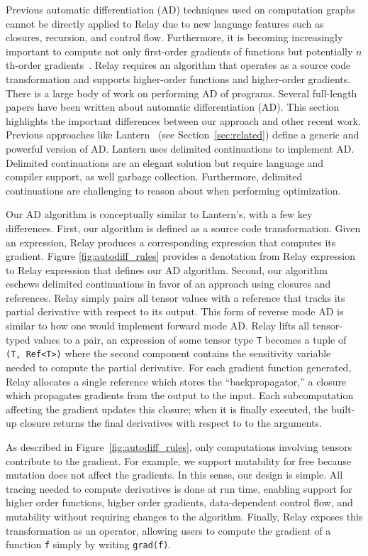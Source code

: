 Previous automatic differentiation (AD) techniques used on
  computation graphs cannot be directly applied to Relay due to new
  language features such as closures, recursion, and control flow.
Furthermore, it is becoming increasingly important to compute not
  only first-order gradients of functions
  but potentially $n$th-order gradients~\cite{neural_ode, darts}.
Relay requires an algorithm that operates as a source code transformation
  and supports higher-order functions and higher-order gradients.
There is a large body of work on performing AD
  of programs.
Several full-length papers have been written about automatic
  differentiation (AD).
This section highlights the important differences
  between our approach and other recent work.
Previous approaches like Lantern~\cite{lantern} (see Section~\ref{sec:related})
  define a generic and powerful version of AD.
Lantern uses delimited continuations to implement AD.
Delimited continuations are an elegant solution
  but require language and compiler support,
  as well garbage collection.
Furthermore, delimited continuations are challenging
  to reason about when performing optimization.

Our AD algorithm is conceptually similar to Lantern's,
  with a few key differences.
First, our algorithm is defined as a source code
  transformation.
Given an expression, Relay produces a corresponding
  expression that computes its gradient.
Figure \ref{fig:autodiff_rules} provides a denotation from
  Relay expression to Relay expression that defines our
  AD algorithm.
Second, our algorithm eschews delimited continuations in favor of
  an approach using closures and references.
Relay simply pairs all tensor values with a reference
  that tracks its partial derivative with respect to its
  output.
This form of reverse mode AD is similar to how one
  would implement forward mode AD.
Relay lifts all tensor-typed values to a pair,
  an expression of some tensor type \verb|T| becomes a tuple of \verb|(T, Ref<T>)|
  where the second component contains the sensitivity variable
  needed to compute the partial derivative.
For each gradient function generated, Relay allocates
  a single reference which stores the ``backpropagator,''
  a closure which propagates gradients from the output to the input.
Each subcomputation affecting the gradient updates this closure; when it is
  finally executed, the built-up closure returns the final derivatives with respect to
  to the arguments.

As described in Figure~\ref{fig:autodiff_rules}, only
  computations involving tensors contribute to the gradient.
For example, we support mutability for free because mutation
  does not affect the gradients.
In this sense, our design is simple.
All tracing needed to compute derivatives is done at run time, enabling
  support for higher order functions, higher order gradients,
  data-dependent control flow, and mutability without requiring changes
  to the algorithm.
Finally, Relay exposes this transformation as an operator, allowing users
  to compute the gradient of a function \verb|f| simply by writing \verb|grad(f)|.

